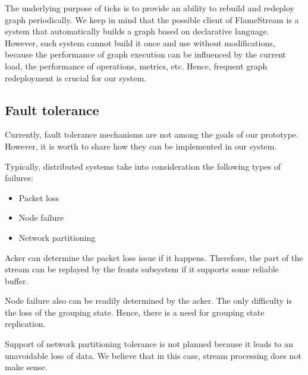 The underlying purpose of ticks is to provide an ability to rebuild and redeploy graph periodically. We keep in mind that the possible client of FlameStream is a system that automatically builds a graph based on declarative language. However, such system cannot build it once and use without modifications, because the performance of graph execution can be influenced by the current load, the performance of operations, metrics, etc. Hence, frequent graph redeployment is crucial for our system. 

\subsection{Fault tolerance}
Currently, fault tolerance mechanisms are not among the goals of our prototype. However, it is worth to share how they can be implemented in our system.

Typically, distributed systems take into consideration the following types of failures:
\begin{itemize}
    \item Packet loss
    \item Node failure
    \item Network partitioning
\end{itemize}

Acker can determine the packet loss issue if it happens. Therefore, the part of the stream can be replayed by the fronts subsystem if it supports some reliable buffer.

Node failure also can be readily determined by the acker. The only difficulty is the loss of the grouping state. Hence, there is a need for grouping state replication.

Support of network partitioning tolerance is not planned because it leads to an unavoidable loss of data. We believe that in this case, stream processing does not make sense.
